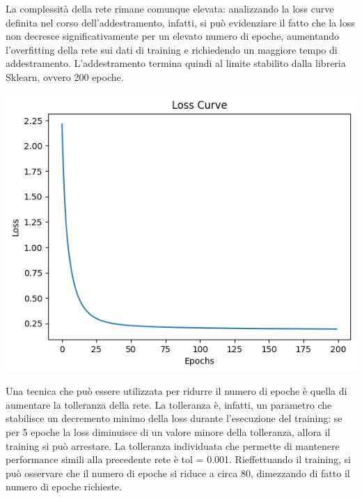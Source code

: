 La complessità della rete rimane comunque elevata: analizzando la loss curve
definita nel corso dell'addestramento, infatti, si può evidenziare il fatto
che la loss non decresce significativamente per un elevato numero di epoche,
aumentando l'overfitting della rete sui dati di training e richiedendo un maggiore
tempo di addestramento. L'addestramento termina quindi al limite stabilito
dalla libreria Sklearn, ovvero 200 epoche.

\begin{Figure}
    \centering
    \includegraphics[width=0.9\linewidth]{img/mlp_low_loss.png}
\end{Figure}

Una tecnica che può essere utilizzata per ridurre il numero di epoche
è quella di aumentare la tolleranza della rete.
La tolleranza è, infatti, un parametro che stabilisce un decremento minimo
della loss durante l'esecuzione del training: se per 5 epoche la loss
diminuisce di un valore minore della tolleranza, allora il training si può
arrestare.
La tolleranza individuata che permette di mantenere performance simili alla
precedente rete è tol = 0.001. Rieffettuando il training, si può osservare che 
il numero di epoche si riduce a circa 80, dimezzando di fatto il numero
di epoche richieste.

